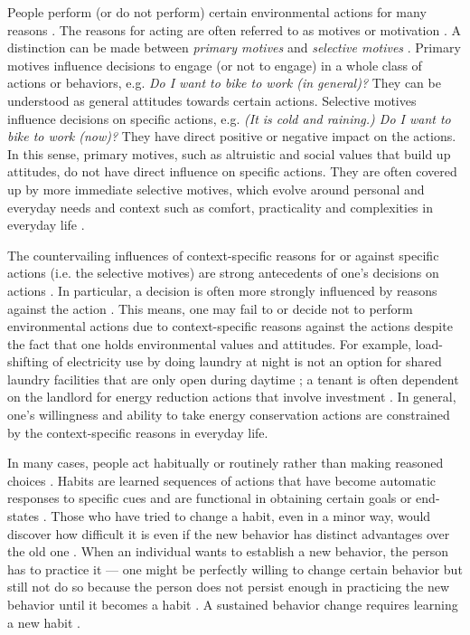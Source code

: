 \documentclass[a4paper,10pt]{article}
\begin{document}
People perform (or do not perform) certain environmental actions for many reasons \citep{Schultz2002}. The reasons for acting are often referred to as motives or motivation \citep{Parfit1997,Moisander2007}. A distinction can be made between \textit{primary motives} and \textit{selective motives} \citep{Kollmuss2002,Moisander2007}. Primary motives influence decisions to engage (or not to engage) in a whole class of actions or behaviors, e.g. \textit{Do I want to bike to work (in general)?} They can be understood as general attitudes towards certain actions. Selective motives influence decisions on specific actions, e.g. \textit{(It is cold and raining.) Do I want to bike to work (now)?} They have direct positive or negative impact on the actions. In this sense, primary motives, such as altruistic and social values that build up attitudes, do not have direct influence on specific actions. They are often covered up by more immediate selective motives, which evolve around personal and everyday needs and context such as comfort, practicality and complexities in everyday life \citep{Kollmuss2002,Berthou2013,Selvefors2015}. 

The countervailing influences of context-specific reasons for or against specific actions (i.e. the selective motives) are strong antecedents of one's decisions on actions \citep{Claudy2013}. In particular, a decision is often more strongly influenced by reasons against 
the action \citep{Claudy2013,Berthou2013}. This means, one may fail to or decide not to perform environmental actions due to context-specific reasons against the actions despite the fact that one holds environmental values and attitudes. For example, load-shifting of electricity use by doing laundry at night is not an option for shared laundry facilities that are only open during daytime \citep{Entwistle2015}; a tenant is often dependent on the landlord for energy reduction actions that involve investment \citep{Dillahunt2010}. In general, one's willingness and ability to take energy conservation actions are constrained by the context-specific reasons in everyday life. 

In many cases, people act habitually or routinely rather than making reasoned choices \citep{Steg2009,Berthou2013}. Habits are learned sequences of actions that have become automatic responses to specific cues and are functional in obtaining certain goals or end-states \citep{Verplanken1999}. Those who have tried to change a habit, even in a minor way, would discover how difficult it is even if the new behavior has distinct advantages over the old one \citep{Kollmuss2002}. When an individual wants to establish a new behavior, the person has to practice it --- one might be perfectly willing to change certain behavior but still not do so because the person does not persist enough in practicing the new behavior until it becomes a habit \citep{Kollmuss2002}. A sustained behavior change requires learning a new habit \citep{Dillahunt:2009:GEU:1620545.1620583}. 
\end{document}
